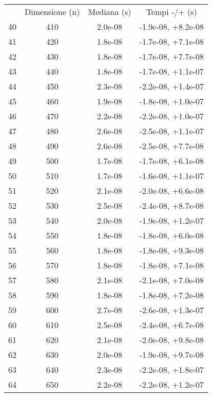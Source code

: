 \begin{table}
\centering
\begin{adjustbox}{width=1\textwidth/2}
\begin{tabular}{|c|c|c|c|}
\hline
 & Dimensione (n) & Mediana (s) & Tempi -/+ (s) \\
40 & 410 & 2.0e-08 & -1.9e-08, +8.2e-08 \\
\cline{1-4}
41 & 420 & 1.8e-08 & -1.7e-08, +7.1e-08 \\
\cline{1-4}
42 & 430 & 1.8e-08 & -1.7e-08, +7.7e-08 \\
\cline{1-4}
43 & 440 & 1.8e-08 & -1.7e-08, +1.1e-07 \\
\cline{1-4}
44 & 450 & 2.3e-08 & -2.2e-08, +1.4e-07 \\
\cline{1-4}
45 & 460 & 1.9e-08 & -1.8e-08, +1.0e-07 \\
\cline{1-4}
46 & 470 & 2.2e-08 & -2.2e-08, +1.0e-07 \\
\cline{1-4}
47 & 480 & 2.6e-08 & -2.5e-08, +1.1e-07 \\
\cline{1-4}
48 & 490 & 2.6e-08 & -2.5e-08, +7.7e-08 \\
\cline{1-4}
49 & 500 & 1.7e-08 & -1.7e-08, +6.1e-08 \\
\cline{1-4}
50 & 510 & 1.7e-08 & -1.6e-08, +1.1e-07 \\
\cline{1-4}
51 & 520 & 2.1e-08 & -2.0e-08, +6.6e-08 \\
\cline{1-4}
52 & 530 & 2.5e-08 & -2.4e-08, +8.7e-08 \\
\cline{1-4}
53 & 540 & 2.0e-08 & -1.9e-08, +1.2e-07 \\
\cline{1-4}
54 & 550 & 1.8e-08 & -1.8e-08, +6.0e-08 \\
\cline{1-4}
55 & 560 & 1.8e-08 & -1.8e-08, +9.3e-08 \\
\cline{1-4}
56 & 570 & 1.8e-08 & -1.8e-08, +7.1e-08 \\
\cline{1-4}
57 & 580 & 2.1e-08 & -2.1e-08, +7.0e-08 \\
\cline{1-4}
58 & 590 & 1.8e-08 & -1.8e-08, +7.2e-08 \\
\cline{1-4}
59 & 600 & 2.7e-08 & -2.6e-08, +1.3e-07 \\
\cline{1-4}
60 & 610 & 2.5e-08 & -2.4e-08, +6.7e-08 \\
\cline{1-4}
61 & 620 & 2.1e-08 & -2.0e-08, +9.8e-08 \\
\cline{1-4}
62 & 630 & 2.0e-08 & -1.9e-08, +9.7e-08 \\
\cline{1-4}
63 & 640 & 2.3e-08 & -2.2e-08, +1.8e-07 \\
\cline{1-4}
64 & 650 & 2.2e-08 & -2.2e-08, +1.2e-07 \\

\end{tabular}
\end{adjustbox}
\end{table}
